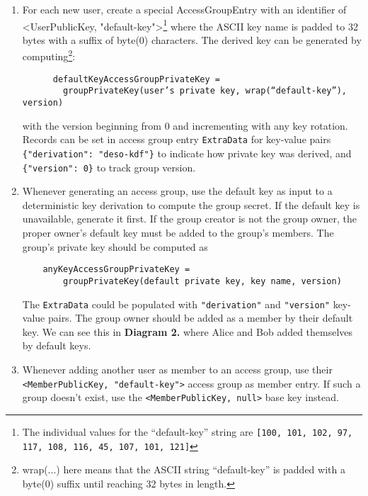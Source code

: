 \documentclass[oneside, 12pt]{article}
\newcommand{\fn}[1]{\footnote{\hangpara{1.4em}{1} #1}}
\begin{document}
\begin{enumerate}
  \item For each new user, create a special AccessGroupEntry with an identifier of <UserPublicKey, "default-key">\fn{The individual values for the “default-key” string are \texttt{[100, 101, 102, 97, 117, 108, 116, 45, 107, 101, 121]}} where the ASCII key name is padded to 32 bytes with a suffix of byte(0) characters. The derived key can be generated by computing\fn{wrap(...) here means that the ASCII string “default-key” is padded with a byte(0) suffix until reaching 32 bytes in length.}:
  \begin{verbatim}
      defaultKeyAccessGroupPrivateKey =
        groupPrivateKey(user’s private key, wrap(“default-key”), version)
  \end{verbatim}
  \vspace*{-0.5cm}
  with the version beginning from 0 and incrementing with any key rotation. Records can be set in access group entry \texttt{ExtraData} for key-value pairs \texttt{\{"derivation": "deso-kdf"\}} to indicate how private key was derived, and \texttt{\{"version": 0\}} to track group version.

  \item Whenever generating an access group, use the default key as input to a deterministic key derivation to compute the group secret. If the default key is unavailable, generate it first. If the group creator is not the group owner, the proper owner’s default key must be added to the group’s members. The group’s private key should be computed as
  \begin{verbatim}
    anyKeyAccessGroupPrivateKey =
        groupPrivateKey(default private key, key name, version)
  \end{verbatim}
  \vspace*{-0.5cm}
  The \texttt{ExtraData} could be populated with \texttt{"derivation"} and \texttt{"version"} key-value pairs. The group owner should be added as a member by their default key. We can see this in \textbf{Diagram 2.} where Alice and Bob added themselves by default keys.

  \item Whenever adding another user as member to an access group, use their \texttt{<MemberPublicKey, "default-key">} access group as member entry. If such a group doesn’t exist, use the \texttt{<MemberPublicKey, null>} base key instead.

\end{enumerate}
\end{document}
